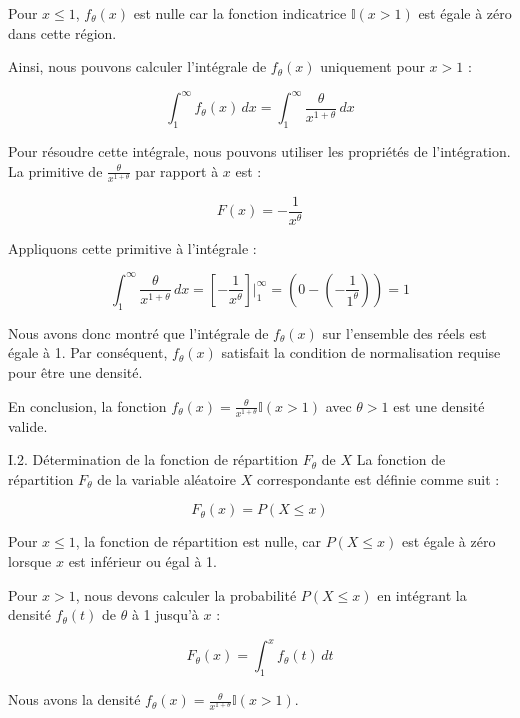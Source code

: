 \documentclass[11pt]{beamer}
\begin{document}
	\begin{frame}
		
		Pour $x \leq 1$, $f_\theta(x)$ est nulle car la fonction indicatrice $\mathbb{I}(x > 1)$ est égale à zéro dans cette région.
		
		Ainsi, nous pouvons calculer l'intégrale de $f_\theta(x)$ uniquement pour $x > 1$ :
		
		\[ \int_{1}^{\infty} f_\theta(x) \, dx = \int_{1}^{\infty} \frac{\theta}{x^{1+\theta}} \, dx \]
		
		Pour résoudre cette intégrale, nous pouvons utiliser les propriétés de l'intégration. La primitive de $\frac{\theta}{x^{1+\theta}}$ par rapport à $x$ est :
		
		\[ F(x) = -\frac{1}{x^\theta} \]
		
		Appliquons cette primitive à l'intégrale :
		
		\[ \int_{1}^{\infty} \frac{\theta}{x^{1+\theta}} \, dx = \left[ -\frac{1}{x^\theta} \right] \Bigg|_{1}^{\infty} = \left(0 - \left(-\frac{1}{1^\theta}\right)\right) = 1 \]
		
	\end{frame}
	\begin{frame}
		Nous avons donc montré que l'intégrale de $f_\theta(x)$ sur l'ensemble des réels est égale à 1. Par conséquent, $f_\theta(x)$ satisfait la condition de normalisation requise pour être une densité.
	
	En conclusion, la fonction $f_\theta(x) = \frac{\theta}{x^{1+\theta}} \mathbb{I}(x > 1)$ avec $\theta > 1$ est une densité valide.
\end{frame}

\begin{frame}{I.2. Détermination de la fonction de répartition $F_\theta$ de $X$}
	La fonction de répartition $F_\theta$ de la variable aléatoire $X$ correspondante est définie comme suit :
	
	\[ F_\theta(x) = P(X \leq x) \]
	
	Pour $x \leq 1$, la fonction de répartition est nulle, car $P(X \leq x)$ est égale à zéro lorsque $x$ est inférieur ou égal à 1.
	
	Pour $x > 1$, nous devons calculer la probabilité $P(X \leq x)$ en intégrant la densité $f_\theta(t)$ de $\theta$ à 1 jusqu'à $x$ :
	
	\[ F_\theta(x) = \int_{1}^{x} f_\theta(t) \, dt \]
	
	Nous avons la densité $f_\theta(x) = \frac{\theta}{x^{1+\theta}} \mathbb{I}(x > 1)$.
		
\end{frame}
\end{document}
